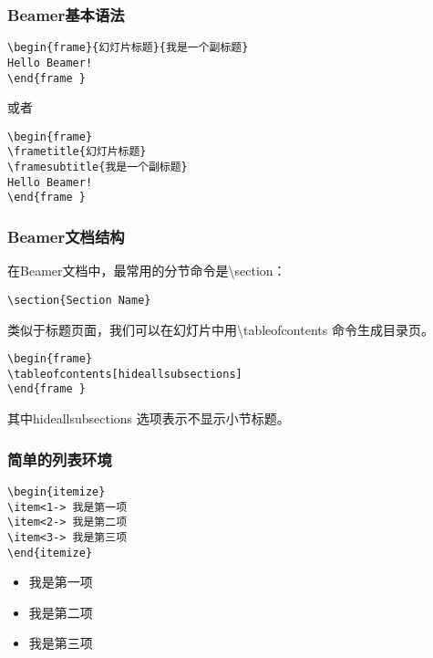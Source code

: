 \begin{frame}[fragile]\frametitle{Beamer基本语法}
\begin{block}{}
    \begin{verbatim}
\begin{frame}{幻灯片标题}{我是一个副标题}
Hello Beamer!
\end{frame }
    \end{verbatim}
\end{block}
或者
\begin{block}{}
    \begin{verbatim}
\begin{frame}
\frametitle{幻灯片标题}
\framesubtitle{我是一个副标题}
Hello Beamer!
\end{frame }
    \end{verbatim}
\end{block}
\end{frame}

\begin{frame}[fragile]\frametitle{Beamer文档结构}
在Beamer文档中，最常用的分节命令是\textbackslash section：
\begin{block}{}
    \begin{verbatim}
\section{Section Name}
    \end{verbatim}
\end{block}
类似于标题页面，我们可以在幻灯片中用\textbackslash tableofcontents 命令生成目录页。
\begin{block}{}
    \begin{verbatim}
\begin{frame}
\tableofcontents[hideallsubsections]
\end{frame }
    \end{verbatim}
\end{block}
其中hideallsubsections 选项表示不显示小节标题。
\end{frame}

\begin{frame}[fragile]\frametitle{简单的列表环境}
\begin{block}{}
    \begin{verbatim}
\begin{itemize}
\item<1-> 我是第一项
\item<2-> 我是第二项
\item<3-> 我是第三项
\end{itemize}
    \end{verbatim}
\end{block}
\begin{block}{}
\begin{itemize}
\item<1-> 我是第一项
\item<2-> 我是第二项
\item<3-> 我是第三项
\end{itemize}
\end{block}
\end{frame}

